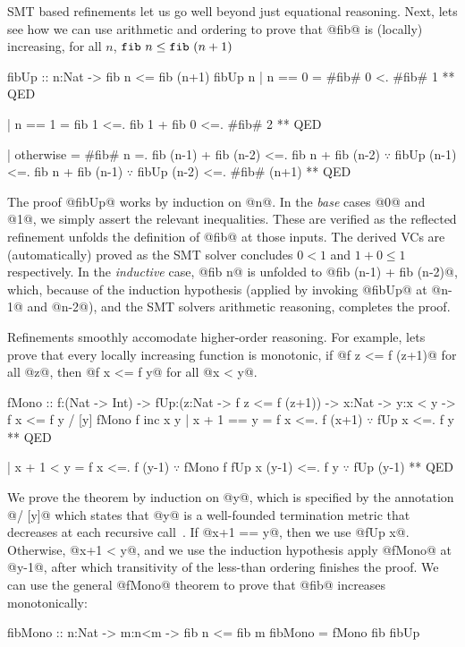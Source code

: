 %
SMT based refinements let us go well beyond just equational
reasoning. Next, lets see how we can use arithmetic and
ordering to prove that @fib@ is (locally) increasing,
%
\ie for all $n$, $\texttt{fib}\ {n} \leq \texttt{fib}\ {(n+1)}$
%
\begin{mcode}
  fibUp :: n:Nat -> {fib n <= fib (n+1)}
  fibUp n
    | n == 0
    =  #fib# 0 <. #fib# 1
    ** QED

    | n == 1
    =  fib 1 <=. fib 1 + fib 0 <=. #fib# 2
    ** QED

    | otherwise
    =  #fib# n
    =. fib (n-1) + fib (n-2)
    <=. fib n     + fib (n-2) $\because$ fibUp (n-1)
    <=. fib n     + fib (n-1) $\because$ fibUp (n-2)
    <=. #fib# (n+1)
    ** QED
\end{mcode} %

%
The proof @fibUp@ works by induction on @n@.
%
In the \emph{base} cases @0@ and @1@, we simply assert
the relevant inequalities. These are verified as the
reflected refinement unfolds the definition of
@fib@ at those inputs.
%
The derived VCs are (automatically) proved
as the SMT solver concludes $0 < 1$ and $1 + 0 \leq 1$
respectively.
%
In the \emph{inductive} case, @fib n@ is unfolded
to  @fib (n-1) + fib (n-2)@, which, because of the
induction hypothesis (applied by invoking @fibUp@
at @n-1@ and @n-2@), and the SMT solvers arithmetic
reasoning, completes the proof.

%
Refinements smoothly accomodate higher-order reasoning.
%
For example, lets prove that every locally increasing
function is monotonic, \ie
if @f z <= f (z+1)@ for all @z@,
then @f x <= f y@ for all @x < y@.
%
\begin{mcode}
  fMono :: f:(Nat -> Int)
        -> fUp:(z:Nat -> {f z <= f (z+1)})
        -> x:Nat
        -> y:{x < y}
        -> {f x <= f y} / [y]
  fMono f inc x y
    | x + 1 == y
    =  f x <=. f (x+1) $\because$ fUp x
           <=. f y
           ** QED

    | x + 1 < y
    =  f x <=. f (y-1) $\because$ fMono f fUp x (y-1)
           <=. f y     $\because$ fUp (y-1)
           ** QED
\end{mcode}
%
We prove the theorem by induction
on @y@, which is specified by the
annotation @/ [y]@ which states
that @y@ is a well-founded
termination metric that decreases
at each recursive call~\citep{Vazou14}.
%
%
If @x+1 == y@, then we use @fUp x@.
%
Otherwise, @x+1 < y@, and we use
the induction hypothesis \ie apply
@fMono@ at @y-1@, after which
transitivity of the less-than
ordering finishes the proof.
%
We can use the general @fMono@
theorem to prove that @fib@
increases monotonically:
%
\begin{code}
  fibMono :: n:Nat -> m:{n<m} ->
             {fib n <= fib m}
  fibMono = fMono fib fibUp
\end{code}


